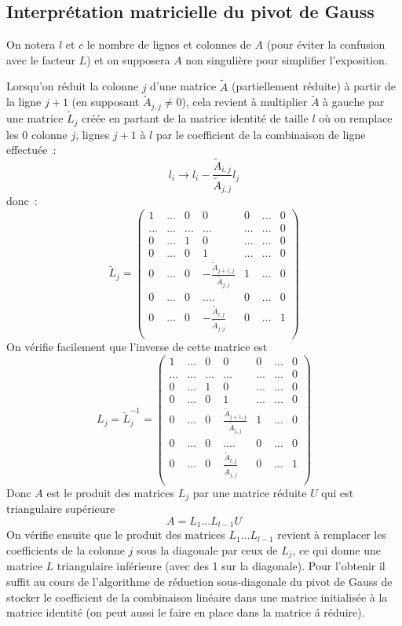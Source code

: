 \documentclass[a4paper,11pt]{book}
\begin{document}
\begin{giacjshere}
\subsection{Interpr\'etation matricielle du pivot de Gauss}
On notera $l$ et $c$ le nombre de lignes et colonnes de $A$ (pour
\'eviter la confusion avec le facteur $L$) et on
supposera $A$ non singuli\`ere pour simplifier l'exposition.

 Lorsqu'on r\'eduit la colonne $j$ d'une matrice $\tilde{A}$
 (partiellement r\'eduite) \`a partir
de la ligne $j+1$ (en supposant $\tilde{A}_{j,j} \neq 0$), cela revient \`a
multiplier $\tilde{A}$ \`a gauche par une matrice $\tilde{L}_j$ cr\'e\'ee en
partant de la matrice
identit\'e de taille $l$ o\`u on remplace les 0 
colonne $j$, lignes $j+1$ \`a $l$ par 
le coefficient de la combinaison de ligne effectu\'ee~:
$$l_i \rightarrow l_i - \frac{\tilde{A}_{i,j}}{\tilde{A}_{j,j}} l_j $$
donc~:
\[ \tilde{L}_j = \left( \begin{array}{ccccccc}
1 & ... & 0   & 0 & 0 & ... & 0\\
...& ... & ... & ... & ... & ... & 0\\
0 & ... & 1   & 0 & ... & ... & 0\\
0 & ... & 0 & 1  & ... & ... & 0 \\
0 & ... & 0 & - \frac{\tilde{A}_{j+1,j}}{\tilde{A}_{j,j}} & 1 & ... & 0 \\
 0 & ... & 0  & .... & 0 & ... & 0 \\
0 & ... & 0 & - \frac{\tilde{A}_{l,j}}{\tilde{A}_{j,j}} & 0 & ... & 1\\
\end{array} \right) \]
On v\'erifie facilement que l'inverse de cette matrice est
\[ L_j = \tilde{L}_j^{-1} = \left( \begin{array}{ccccccc}
1 & ... & 0   & 0 & 0 & ... & 0\\
...& ... & ... & ... & ... & ... & 0\\
0 & ... & 1   & 0 & ... & ... & 0\\
0 & ... & 0 & 1  & ... & ... & 0 \\
0 & ... & 0 & \frac{\tilde{A}_{j+1,j}}{\tilde{A}_{j,j}} & 1 & ... & 0 \\
 0 & ... & 0  & .... & 0 & ... & 0 \\
0 & ... & 0 & \frac{\tilde{A}_{l,j}}{\tilde{A}_{j,j}} & 0 & ... & 1\\
\end{array} \right) \]
Donc $A$ est le produit des matrices $L_j$ par une matrice r\'eduite
$U$ qui est triangulaire sup\'erieure
\[ A= L_1...L_{l-1} U \]
On v\'erifie ensuite que le produit des matrices $L_1...L_{l-1}$ revient \`a
remplacer les coefficients de la colonne $j$ sous la diagonale 
par ceux de $L_j$, ce qui donne une matrice $L$ triangulaire
inf\'erieure (avec des 1 sur la diagonale). Pour l'obtenir il suffit
au cours de l'algorithme de r\'eduction sous-diagonale du 
pivot de Gauss de stocker le coefficient
de la combinaison lin\'eaire dans une matrice initialis\'ee
\`a la matrice identit\'e (on peut aussi le faire
en place dans la matrice \'a r\'eduire).


\end{giacjshere}
\end{document}
